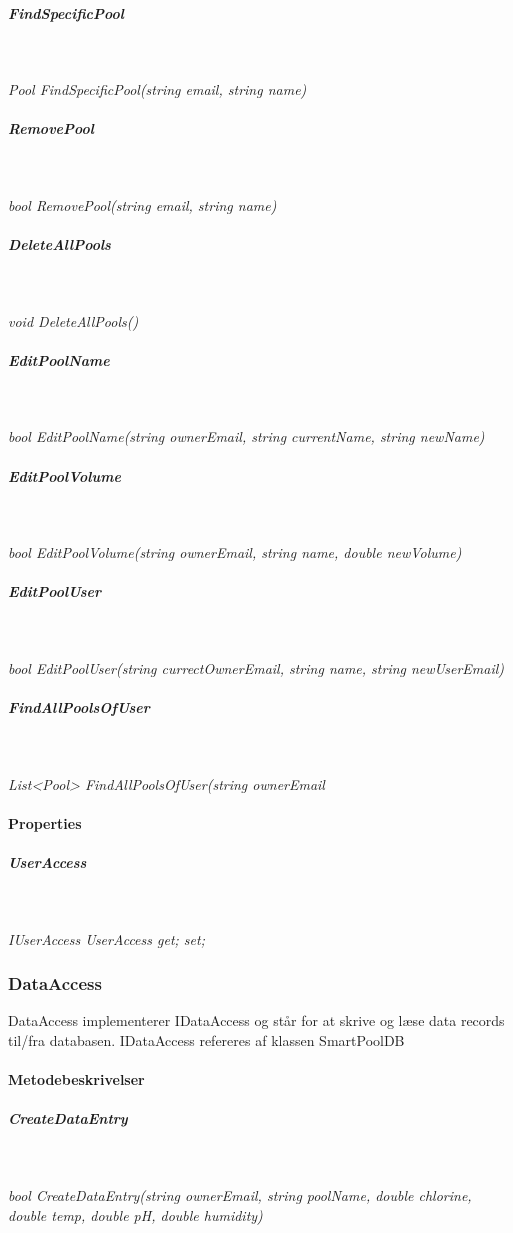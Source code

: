 \subparagraph{FindSpecificPool}\

\textit{Pool FindSpecificPool(string email, string name)}

\subparagraph{RemovePool}\

\textit{bool RemovePool(string email, string name)}

\subparagraph{DeleteAllPools}\

\textit{void DeleteAllPools()}

\subparagraph{EditPoolName}\

\textit{bool EditPoolName(string ownerEmail, string currentName, string newName)}

\subparagraph{EditPoolVolume}\

\textit{bool EditPoolVolume(string ownerEmail, string name, double newVolume)}

\subparagraph{EditPoolUser}\

\textit{bool EditPoolUser(string currectOwnerEmail, string name, string newUserEmail)}


\subparagraph{FindAllPoolsOfUser}\

\textit{List<Pool> FindAllPoolsOfUser(string ownerEmail}

\paragraph{Properties}

\subparagraph{UserAccess}\

\textit{IUserAccess UserAccess { get; set; }}


\subsubsection{DataAccess}
DataAccess implementerer IDataAccess og står for at skrive og læse data records til/fra databasen.
IDataAccess refereres af klassen SmartPoolDB



\paragraph{Metodebeskrivelser}

\subparagraph{CreateDataEntry}\

\textit{bool CreateDataEntry(string ownerEmail, string poolName, double chlorine, double temp, double pH, double humidity)}


